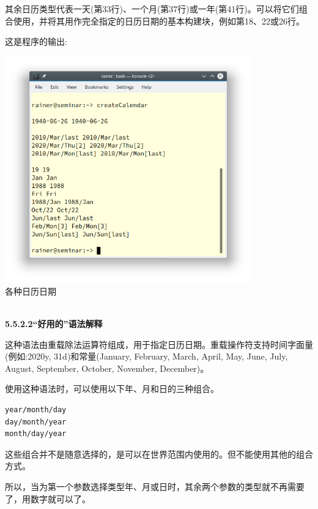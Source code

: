 其余日历类型代表一天(第33行)、一个月(第37行)或一年(第41行)。可以将它们组合使用，并将其用作完全指定的日历日期的基本构建块，例如第18、22或26行。

这是程序的输出:

\begin{center}
\includegraphics[width=0.8\textwidth]{content/3/chapter5/images/20.png}\\
各种日历日期
\end{center}

\hspace*{\fill} \\ %
\noindent
\textbf{5.5.2.2\hspace{0.2cm}“好用的”语法解释}

这种语法由重载除法运算符组成，用于指定日历日期。重载操作符支持时间字面量(例如:2020y, 31d)和常量(January, February, March, April, May, June, July, August, September, October, November, December)。

使用这种语法时，可以使用以下年、月和日的三种组合。

\begin{lstlisting}[style=styleCXX]
year/month/day
day/month/year
month/day/year
\end{lstlisting}

这些组合并不是随意选择的，是可以在世界范围内使用的。但不能使用其他的组合方式。

所以，当为第一个参数选择类型年、月或日时，其余两个参数的类型就不再需要了，用数字就可以了。

